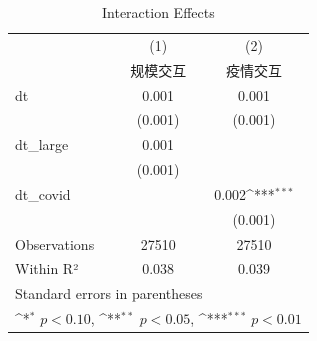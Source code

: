 \begin{table}[htbp]\centering\small
\def\sym#1{\ifmmode^{#1}\else\(^{#1}\)\fi}
\caption{Interaction Effects}
\begin{tabular}{l*{2}{c}}
\hline\hline
            &\multicolumn{1}{c}{(1)}&\multicolumn{1}{c}{(2)}\\
            &\multicolumn{1}{c}{规模交互}&\multicolumn{1}{c}{疫情交互}\\
\hline
dt          &       0.001         &       0.001         \\
            &     (0.001)         &     (0.001)         \\
[1em]
dt\_large    &       0.001         &                     \\
            &     (0.001)         &                     \\
[1em]
dt\_covid    &                     &       0.002\sym{***}\\
            &                     &     (0.001)         \\
\hline
Observations&       27510         &       27510         \\
Within R²   &       0.038         &       0.039         \\
\hline\hline
\multicolumn{3}{l}{\footnotesize Standard errors in parentheses}\\
\multicolumn{3}{l}{\footnotesize \sym{*} \(p<0.10\), \sym{**} \(p<0.05\), \sym{***} \(p<0.01\)}\\
\end{tabular}
\end{table}
